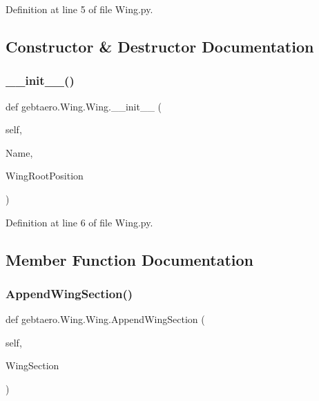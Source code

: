 Definition at line 5 of file Wing.\+py.



\subsection{Constructor \& Destructor Documentation}
\mbox{\label{classgebtaero_1_1_wing_1_1_wing_ad4899077f16bf8b8dff5e9ce86c4b2c0}} 
\subsubsection{\texorpdfstring{\+\_\+\+\_\+init\+\_\+\+\_\+()}{\_\_init\_\_()}}
{\footnotesize\ttfamily def gebtaero.\+Wing.\+Wing.\+\_\+\+\_\+init\+\_\+\+\_\+ (\begin{DoxyParamCaption}\item[{}]{self,  }\item[{}]{Name,  }\item[{}]{Wing\+Root\+Position }\end{DoxyParamCaption})}



Definition at line 6 of file Wing.\+py.



\subsection{Member Function Documentation}
\mbox{\label{classgebtaero_1_1_wing_1_1_wing_ae2bcf197a55c10900d837bc0d9d6aac7}} 
\subsubsection{\texorpdfstring{Append\+Wing\+Section()}{AppendWingSection()}}
{\footnotesize\ttfamily def gebtaero.\+Wing.\+Wing.\+Append\+Wing\+Section (\begin{DoxyParamCaption}\item[{}]{self,  }\item[{}]{Wing\+Section }\end{DoxyParamCaption})}

